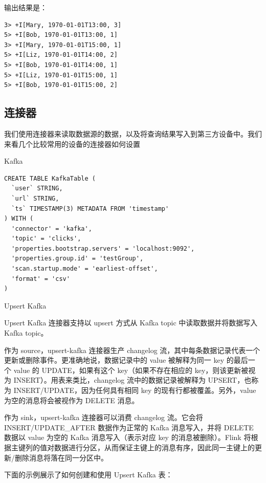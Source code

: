 \documentclass[cn,11pt,chinese]{elegantbook}
\begin{document}
输出结果是：

\begin{verbatim}
3> +I[Mary, 1970-01-01T13:00, 3]
5> +I[Bob, 1970-01-01T13:00, 1]
3> +I[Mary, 1970-01-01T15:00, 1]
5> +I[Liz, 1970-01-01T14:00, 2]
5> +I[Bob, 1970-01-01T14:00, 1]
5> +I[Liz, 1970-01-01T15:00, 1]
5> +I[Bob, 1970-01-01T15:00, 2]
\end{verbatim}

\subsection{连接器}

我们使用连接器来读取数据源的数据，以及将查询结果写入到第三方设备中。我们来看几个比较常用的设备的连接器如何设置

Kafka

\begin{verbatim}
CREATE TABLE KafkaTable (
  `user` STRING,
  `url` STRING,
  `ts` TIMESTAMP(3) METADATA FROM 'timestamp'
) WITH (
  'connector' = 'kafka',
  'topic' = 'clicks',
  'properties.bootstrap.servers' = 'localhost:9092',
  'properties.group.id' = 'testGroup',
  'scan.startup.mode' = 'earliest-offset',
  'format' = 'csv'
)
\end{verbatim}

Upsert Kafka

Upsert Kafka 连接器支持以 upsert 方式从 Kafka topic 中读取数据并将数据写入 Kafka topic。

作为 source，upsert-kafka 连接器生产 changelog 流，其中每条数据记录代表一个更新或删除事件。更准确地说，数据记录中的 value 被解释为同一 key 的最后一个 value 的 UPDATE，如果有这个 key（如果不存在相应的 key，则该更新被视为 INSERT）。用表来类比，changelog 流中的数据记录被解释为 UPSERT，也称为 INSERT/UPDATE，因为任何具有相同 key 的现有行都被覆盖。另外，value 为空的消息将会被视作为 DELETE 消息。

作为 sink，upsert-kafka 连接器可以消费 changelog 流。它会将 INSERT/UPDATE\_AFTER 数据作为正常的 Kafka 消息写入，并将 DELETE 数据以 value 为空的 Kafka 消息写入（表示对应 key 的消息被删除）。Flink 将根据主键列的值对数据进行分区，从而保证主键上的消息有序，因此同一主键上的更新/删除消息将落在同一分区中。

下面的示例展示了如何创建和使用 Upsert Kafka 表：
\end{document}
